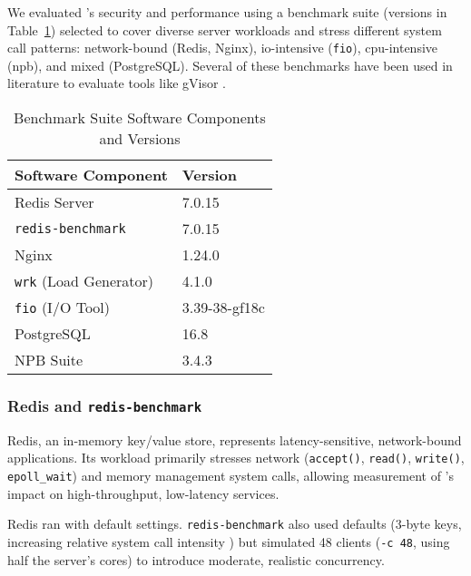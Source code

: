 We evaluated \af's security and performance using a benchmark suite (versions
in Table~\ref{tab:benchmark_software_versions}) selected to cover diverse
server workloads and stress different system call patterns: network-bound (Redis,
Nginx), \ac{io}-intensive (\texttt{fio}), \ac{cpu}-intensive (\ac{npb}),
and mixed (PostgreSQL). Several of these benchmarks have been used in
literature to evaluate tools like gVisor \textcite{lerner2019gvisor}.

\begin{table}[h] 
    \centering 
    \caption{Benchmark Suite Software Components and Versions}
    \label{tab:benchmark_software_versions}
    \begin{tabular}{@{}ll@{}} %
        \toprule
        Software Component    & Version \\
        \midrule
        Redis Server          & 7.0.15 \\
        \texttt{redis-benchmark} & 7.0.15 \\
        Nginx                 & 1.24.0 \\
        \texttt{wrk} (Load Generator) & 4.1.0 \\ %
        \texttt{fio} (I/O Tool) & 3.39-38-gf18c \\ %
        PostgreSQL            & 16.8 \\
        NPB Suite             & 3.4.3 \\ %
        \bottomrule
    \end{tabular}
\end{table}

\subsubsection{Redis and \texttt{redis-benchmark}}\label{subsubsec:redis-just}

Redis, an in-memory key/value store, represents latency-sensitive, network-bound
applications. Its workload primarily stresses network (\texttt{accept()},
\texttt{read()}, \texttt{write()}, \texttt{epoll\_wait}) and memory management system calls, allowing measurement of \af's impact on high-throughput, low-latency services.

Redis ran with default settings. \texttt{redis-benchmark} also used defaults (3-byte keys, increasing relative system call intensity \cite{zhou2023userspace}) but simulated 48 clients (\texttt{-c 48}, using half the server's cores) to introduce moderate, realistic concurrency.


